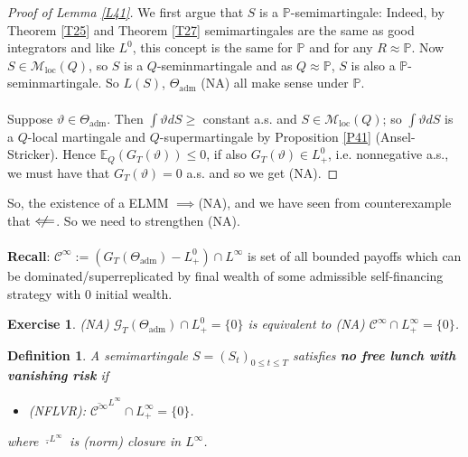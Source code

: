 \documentclass[12pt,a4paper, twoside]{article}
\newtheorem{defn}{Definition}[section]
\newtheorem{exe}{Exercise}[section]
\theoremstyle{definition}
\newcommand{\EE}{\mathbb{E}} %
\newcommand{\PP}{\mathbb{P}} %
\begin{document}
\begin{proof}[Proof of Lemma \ref{L41}] We first argue that $S$ is a $\PP$-semimartingale: Indeed, by Theorem \ref{T25} and Theorem \ref{T27} semimartingales are the same as good integrators and like $L^0$, this concept is the same for $\PP$ and for any $R \approx \PP$. Now $S \in \mathcal{M}_\text{loc}(Q)$, so $S$ is a $Q$-seminmartingale and as $Q \approx \PP$, $S$ is also a $\PP$-seminmartingale. So $L(S)$, $\Theta_\text{adm}$ (NA) all make sense under $\PP$. 
\\\\
Suppose $\vartheta \in \Theta_\text{adm}$. Then $ \int \vartheta dS \geq$ constant a.s. and $S \in \mathcal{M}_\text{loc}(Q)$; so $\int \vartheta dS$ is a $Q$-local martingale and $Q$-supermartingale by Proposition \ref{P41} (Ansel-Stricker). Hence $\EE_Q(G_T( \vartheta)) \leq 0$, if also $G_T( \vartheta) \in L_+^0$, i.e. nonnegative a.s., we must have that $G_T( \vartheta)=0$ a.s. and so we get (NA).
\end{proof}
So, the existence of a ELMM $\implies $(NA), and we have seen from counterexample that $\centernot\Longleftarrow$. So we need to strengthen (NA). 
\\\\
\textbf{Recall}: $\mathcal{C}^\infty := ( G_T( \Theta_\text{adm})-L_+^0) \cap L^\infty$ is set of all bounded payoffs which can be dominated/superreplicated by final wealth of some admissible self-financing strategy with $0$ initial wealth. 
\begin{exe} (NA) $\mathcal{G}_T( \Theta_\text{adm}) \cap L_+^0 = \{0\}$ is equivalent to (NA) $\mathcal{C}^\infty \cap L_+^\infty = \{0 \}$. 
\end{exe}
\begin{mdframed}[backgroundcolor=yellow!20, topline=true, linewidth=2.0pt]
\begin{defn}
A semimartingale $S=(S_t)_{0 \leq t \leq T}$ satisfies \textbf{no free lunch with vanishing risk} if 
\begin{itemize}
\item (NFLVR): $\overline{\mathcal{C}^\infty}^{L^\infty} \cap L_+^\infty = \{0 \}$. 
\end{itemize}
where $\overline{\cdot}^{L^\infty}$ is (norm) closure in $L^\infty$. 
\end{defn}
\end{mdframed}
\newpage
\end{document}

